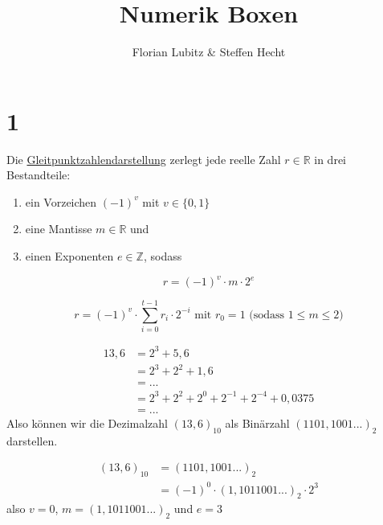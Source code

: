 \documentclass[fontsize=13pt, parskip=half]{scrreprt}
\title{Numerik Boxen}
\author{Florian Lubitz \& Steffen Hecht}
\begin{document}
\maketitle

\chapter{1}

\begin{dbox}
\end{dbox}

\begin{tbox}
	Die \underline{Gleitpunktzahlendarstellung} zerlegt jede reelle Zahl $r \in \mathbb{R}$ in drei Bestandteile:\\
	\begin{enumerate}[label=\Roman*)]
		\item ein Vorzeichen $(-1)^v$ mit $v \in \{0, 1\}$
		\item eine Mantisse $m \in \mathbb{R}$ und
		\item einen Exponenten $e \in \mathbb{Z}$, sodass
	\end{enumerate}
	\begin{equation}
	r = (-1)^v \cdot m \cdot 2^e
	\end{equation}
\end{tbox}

\begin{tbox}
	\begin{equation}
	r = \left(-1\right)^v \cdot \sum_{i = 0}^{t - 1} r_i \cdot 2^{-i} \text{ mit } r_0 = 1 \text{ (sodass } 1 \le m \le 2\text{)}
	\end{equation}
\end{tbox}

\begin{tbox}
	\begin{align*}
	13,6 &= 2^3 + 5,6\\
	&= 2^3 + 2^2 + 1,6\\
	&= ...\\
	&= 2^3 + 2^2 + 2^0 + 2^{-1} + 2^{-4} + 0,0375\\
	&= ...
	\end{align*}
	Also können wir die Dezimalzahl $\left(13,6\right)_{10}$ als Binärzahl $\left(1101,1001...\right)_2$ darstellen.
\end{tbox}

\begin{tbox}
	\begin{align*}
	\left(13,6\right)_{10} &= \left(1101,1001...\right)_2\\
	&= \left(-1\right)^0 \cdot \left(1,1011001...\right)_2 \cdot 2^3
	\end{align*}
	also $v = 0$, $m = \left(1,1011001...\right)_2$ und $e = 3$
\end{tbox}
\end{document}
